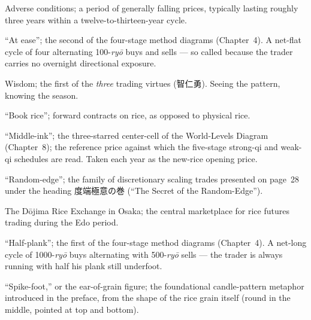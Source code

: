 \documentclass[10pt, openany]{book}
\newcommand{\jp}[1]{{\japanesefont #1}}
\begin{document}
\begin{description}[style=nextline, leftmargin=2em, font=\normalfont\bfseries]

\item[\jp{逢来} (\textit{airai})]
Adverse conditions; a period of generally falling prices, typically
lasting roughly three years within a twelve-to-thirteen-year cycle.

\item[\jp{安楽} (\textit{anraku})]
``At ease''; the second of the four-stage method diagrams
(Chapter~4). A net-flat cycle of four alternating
100-\textit{ry\=o} buys and sells --- so called because the trader
carries no overnight directional exposure.

\item[\jp{智} (\textit{chi})]
Wisdom; the first of the \textit{three} trading virtues
(智仁勇). Seeing the pattern, knowing the season.

\item[\jp{帳合米} (\textit{ch\=oaimai})]
``Book rice''; forward contracts on rice, as opposed to physical
rice.

\item[\jp{中墨} (\textit{nakasumi} / \textit{ch\=uboku})]
``Middle-ink''; the three-starred center-cell of the World-Levels
Diagram (Chapter~8); the reference price against which the
five-stage strong-qi and weak-qi schedules are read. Taken each
year as the new-rice opening price.

\item[\jp{度端} (\textit{dohan})]
``Random-edge''; the family of discretionary scaling trades
presented on page~28 under the heading \jp{度端極意の巻} (``The
Secret of the Random-Edge'').

\item[\jp{堂島} (\textit{D\=ojima})]
The D\=ojima Rice Exchange in Osaka; the central marketplace for
rice futures trading during the Edo period.

\item[\jp{半板} (\textit{hanban})]
``Half-plank''; the first of the four-stage method diagrams
(Chapter~4). A net-long cycle of 1000-\textit{ry\=o} buys
alternating with 500-\textit{ry\=o} sells --- the trader is always
running with half his plank still underfoot.

\item[\jp{穂足} (\textit{hosoku})]
``Spike-foot,'' or the ear-of-grain figure; the foundational
candle-pattern metaphor introduced in the preface, from the shape
of the rice grain itself (round in the middle, pointed at top and
bottom).


\end{description}
\end{document}
